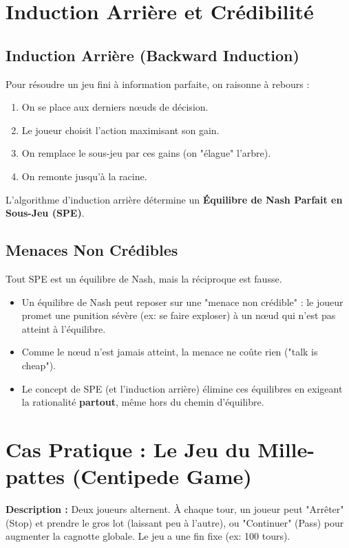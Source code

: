 \section{Induction Arrière et Crédibilité}

\subsection{Induction Arrière (Backward Induction)}
Pour résoudre un jeu fini à information parfaite, on raisonne à rebours :
\begin{enumerate}
    \item On se place aux derniers nœuds de décision.
    \item Le joueur choisit l'action maximisant son gain.
    \item On remplace le sous-jeu par ces gains (on "élague" l'arbre).
    \item On remonte jusqu'à la racine.
\end{enumerate}

\begin{theoreme}
L'algorithme d'induction arrière détermine un \textbf{Équilibre de Nash Parfait en Sous-Jeu (SPE)}.
\end{theoreme}

\subsection{Menaces Non Crédibles}
Tout SPE est un équilibre de Nash, mais la réciproque est fausse.
\begin{itemize}
    \item Un équilibre de Nash peut reposer sur une "menace non crédible" : le joueur promet une punition sévère (ex: se faire exploser) à un nœud qui n'est pas atteint à l'équilibre.
    \item Comme le nœud n'est jamais atteint, la menace ne coûte rien ("talk is cheap").
    \item Le concept de SPE (et l'induction arrière) élimine ces équilibres en exigeant la rationalité \textbf{partout}, même hors du chemin d'équilibre.
\end{itemize}

\section{Cas Pratique : Le Jeu du Mille-pattes (Centipede Game)}

\textbf{Description :}
Deux joueurs alternent. À chaque tour, un joueur peut "Arrêter" (Stop) et prendre le gros lot (laissant peu à l'autre), ou "Continuer" (Pass) pour augmenter la cagnotte globale.
Le jeu a une fin fixe (ex: 100 tours).

